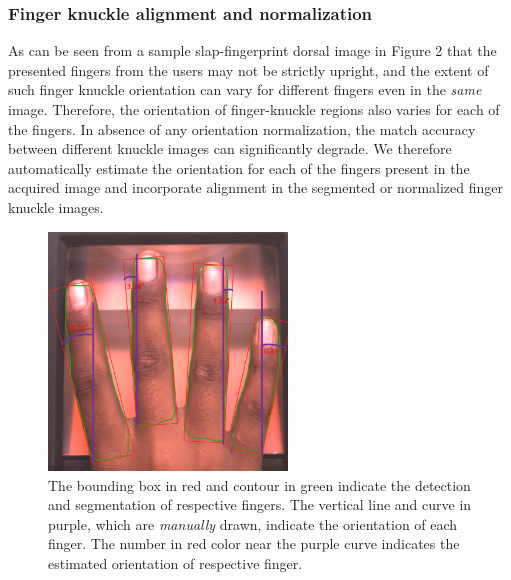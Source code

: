 \subsubsection{Finger knuckle alignment and normalization}

As can be seen from a sample slap-fingerprint dorsal image in Figure 2 that the presented fingers from the users may not be strictly upright, and the extent of such finger knuckle orientation can vary for different fingers even in the \textit{same} image. Therefore, the orientation of finger-knuckle regions also varies for each of the fingers. In absence of any orientation normalization, the match accuracy between different knuckle images can significantly degrade. We therefore automatically estimate the orientation for each of the fingers present in the acquired image and incorporate alignment in the segmented or normalized finger knuckle images.

\begin{figure}
    \centering
    \includegraphics[width=2.5in]{Figures/finger-orientation.png}
    \caption{The bounding box in red and contour in green indicate the detection and segmentation of respective fingers. The vertical line and curve in purple, which are \textit{manually} drawn, indicate the orientation of each finger. The number in red color near the purple curve indicates the estimated orientation of respective finger.}
    \label{finger-orientation}
\end{figure}

